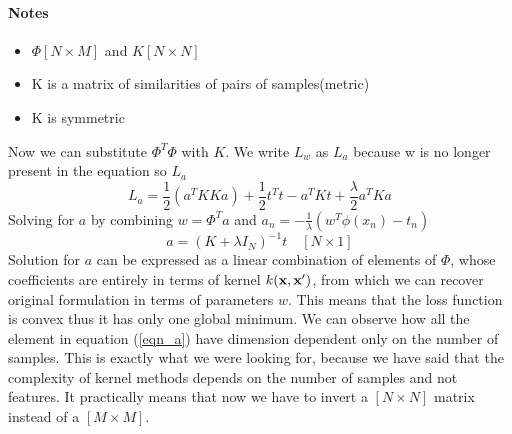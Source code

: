 \documentclass[main.tex]{subfiles}
\begin{document}
\paragraph{Notes} 
\begin{itemize}
    \item $\Phi [N \times M]$ and $K [N \times N]$
    \item K is a matrix of similarities of pairs of samples(metric)
    \item K is symmetric
\end{itemize}
Now we can substitute $\Phi^T \Phi$ with $K$. We write $L_w$ as $L_a$ because w is no longer present in the equation so $L_a$
\begin{equation*}
    L_a = \frac{1}{2}(a^T K K a) + \frac{1}{2}t^T t - a^T K t +\frac{\lambda}{2} a^T K a
\end{equation*}
Solving for $a$ by combining $w=\Phi^T a$ and $a_n=-\frac{1}{\lambda}(w^T \phi(x_n)-t_n)$
\begin{equation}
    a = (K + \lambda I_N)^{-1} t \quad [N \times 1]
\end{equation} \label{eqn_a}
Solution for $a$ can be expressed as a linear combination of elements of $\Phi$, whose coefficients are entirely in terms of kernel $k(\textbf{x},\textbf{x}')$, from
which we can recover original formulation in terms of parameters $w$. This means that the loss function is convex thus it has only one global minimum. We can observe how all the element in equation (\ref{eqn_a}) have dimension dependent only on the number of samples. This is exactly what we were looking for, because we have said that the complexity of kernel methods depends on the number of samples and not features. It practically means that now we have to invert a $[N \times N]$ matrix instead of a $[M \times M]$.
\end{document}
